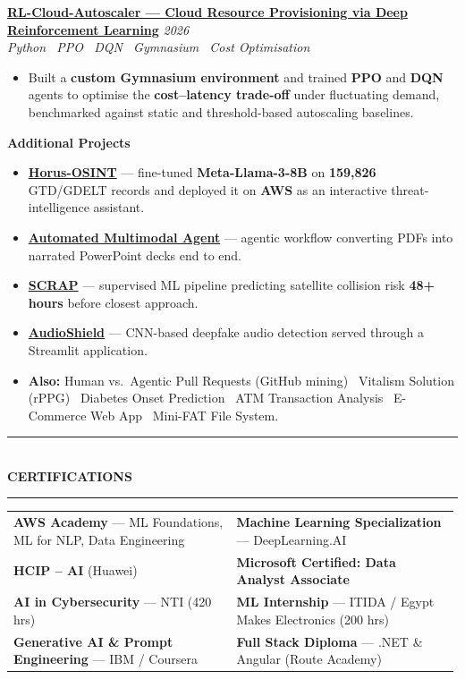 \documentclass[10pt, a4paper]{article}
\makeatletter
\newcommand{\cvsection}[1]{%
  \vspace{3pt}%
  {\color{navy}\rule{\linewidth}{1.1pt}}\\[0.5pt]%
  {\color{navy}\bfseries\fontsize{9.5}{11}\selectfont\uppercase{#1}}\\[-4pt]%
  {\color{teal}\rule{\linewidth}{0.6pt}}%
  \vspace{2pt}%
}
\newcommand{\cvproject}[3]{%
  \vspace{2.5pt}%
  {\bfseries\color{navy}#1} \hfill {\color{midgray}\textit{#3}}\\[-1.5pt]%
  {\color{teal}\textit{#2}}%
}
\newcommand{\cvmini}[2]{\item {\bfseries\color{navy}#1} --- #2}
\newenvironment{cvitems}{%
  \begin{itemize}[leftmargin=11pt, itemsep=0.5pt, parsep=0pt, topsep=1pt,
                  label={\textcolor{teal}{$\bullet$}}]
}{%
  \end{itemize}%
}
\newenvironment{dualcol}{%
  \begin{tabular*}{\linewidth}{@{}p{0.495\linewidth}@{\hspace{0.01\linewidth}}p{0.495\linewidth}@{}}
}{%
  \end{tabular*}%
}
\makeatother
\begin{document}
\cvproject{\href{https://github.com/MahmoudAlyosify/RL-Cloud-Autoscaler}{RL-Cloud-Autoscaler --- Cloud Resource Provisioning via Deep Reinforcement Learning}}
          {Python \textperiodcentered\ PPO \textperiodcentered\ DQN \textperiodcentered\ Gymnasium \textperiodcentered\ Cost Optimisation}
          {2026}
\begin{cvitems}
  \item Built a \textbf{custom Gymnasium environment} and trained \textbf{PPO} and \textbf{DQN} agents to optimise the \textbf{cost--latency trade-off} under fluctuating demand, benchmarked against static and threshold-based autoscaling baselines.
\end{cvitems}

\vspace{3pt}
{\bfseries\color{navy}Additional Projects}
\begin{cvitems}
  \cvmini{\href{https://github.com/MahmoudAlyosify/Horus-OSINT}{Horus-OSINT}}{fine-tuned \textbf{Meta-Llama-3-8B} on \textbf{159,826} GTD/GDELT records and deployed it on \textbf{AWS} as an interactive threat-intelligence assistant.}
  \cvmini{\href{https://github.com/MahmoudAlyosify/Automated-Multimodal-Agent-PDF-to-Narrated-PowerPoint}{Automated Multimodal Agent}}{agentic workflow converting PDFs into narrated PowerPoint decks end to end.}
  \cvmini{\href{https://github.com/MahmoudAlyosify/SCRAP-Satellite-Collision-Risk-Assessment-and-Prediction}{SCRAP}}{supervised ML pipeline predicting satellite collision risk \textbf{48+ hours} before closest approach.}
  \cvmini{\href{https://github.com/MahmoudAlyosify/AudioShield}{AudioShield}}{CNN-based deepfake audio detection served through a Streamlit application.}
  \item \textbf{Also:} Human vs.\ Agentic Pull Requests (GitHub mining) \textperiodcentered\ Vitalism Solution (rPPG) \textperiodcentered\ Diabetes Onset Prediction \textperiodcentered\ ATM Transaction Analysis \textperiodcentered\ E-Commerce Web App \textperiodcentered\ Mini-FAT File System.
\end{cvitems}

\cvsection{Certifications}

\begin{dualcol}
  \textbf{AWS Academy} --- ML Foundations, ML for NLP, Data Engineering &
  \textbf{Machine Learning Specialization} --- DeepLearning.AI \\[2pt]
  \textbf{HCIP -- AI} (Huawei) &
  \textbf{Microsoft Certified: Data Analyst Associate} \\[2pt]
  \textbf{AI in Cybersecurity} --- NTI (420 hrs) &
  \textbf{ML Internship} --- ITIDA / Egypt Makes Electronics (200 hrs) \\[2pt]
  \textbf{Generative AI \& Prompt Engineering} --- IBM / Coursera &
  \textbf{Full Stack Diploma} --- .NET \& Angular (Route Academy) \\
\end{dualcol}
\end{document}
